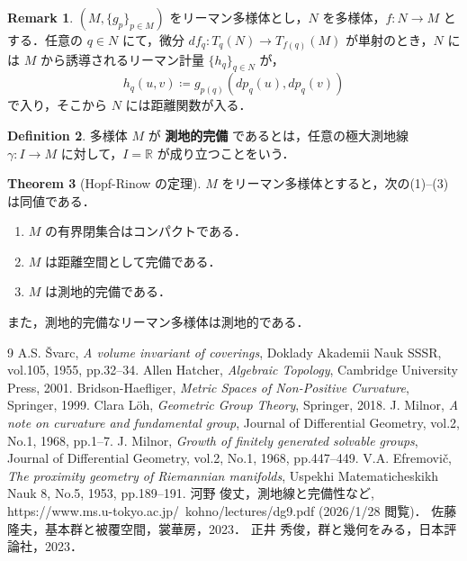 \documentclass[dvipdfmx]{ujarticle}
\theoremstyle{definition}
\newtheorem{dfn}{Definition}[section]
\newtheorem{thm}[dfn]{Theorem}
\newtheorem{rem}[dfn]{Remark}
\begin{document}
\begin{rem}\label{kyori}
$(M,\{g_p\}_{p\in M})$ をリーマン多様体とし，$N$ を多様体，$f\colon N\rightarrow M$ とする．任意の $q\in N$ にて，微分 $df_q\colon T_q(N)\rightarrow T_{f(q)}(M)$ が単射のとき，$N$ には $M$ から誘導されるリーマン計量 $\{h_q\}_{q\in N}$ が，
$$h_q(u,v)\coloneqq g_{p(q)}(dp_{q}(u),dp_{q}(v))$$
で入り，そこから $N$ には距離関数が入る．
\end{rem}

\begin{dfn}
  多様体 $M$ が \textbf{測地的完備} であるとは，任意の極大測地線 $\gamma\colon I\rightarrow M$ に対して，$I=\mathbb{R}$ が成り立つことをいう．
\end{dfn}

\begin{thm}[Hopf-Rinow の定理]
  $M$ をリーマン多様体とすると，次の(1)--(3)は同値である．
  \begin{enumerate}
    \item $M$ の有界閉集合はコンパクトである．
    \item $M$ は距離空間として完備である．
    \item $M$ は測地的完備である．
  \end{enumerate}
  また，測地的完備なリーマン多様体は測地的である．
\end{thm}

\begin{thebibliography}{9}
   A.S. Švarc, \textit{A volume invariant of coverings}, Doklady Akademii Nauk SSSR, vol.105, 1955, pp.32--34.
   Allen Hatcher, \textit{Algebraic Topology}, Cambridge University Press, 2001.
   Bridson-Haefliger, \textit{Metric Spaces of Non-Positive Curvature}, Springer, 1999.
   Clara Löh, \textit{Geometric Group Theory}, Springer, 2018.
   J. Milnor, \textit{A note on curvature and fundamental group}, Journal of Differential Geometry, vol.2, No.1, 1968, pp.1--7.
   J. Milnor, \textit{Growth of finitely generated solvable groups}, Journal of Differential Geometry, vol.2, No.1, 1968, pp.447--449.
   V.A. Efremovič, \textit{The proximity geometry of Riemannian manifolds}, Uspekhi Matematicheskikh Nauk 8, No.5, 1953, pp.189--191.
   河野 俊丈，測地線と完備性など, https://www.ms.u-tokyo.ac.jp/~kohno/lectures/dg9.pdf (2026/1/28 閲覧)．
   佐藤 隆夫，基本群と被覆空間，裳華房，2023．
   正井 秀俊，群と幾何をみる，日本評論社，2023．
\end{thebibliography}
\end{document}
